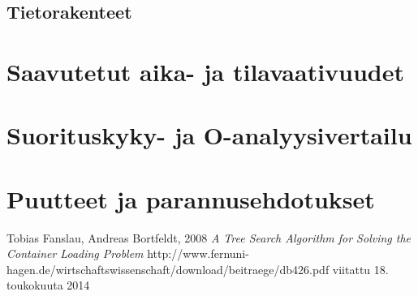 \documentclass[a4paper,12pt, titlepage]{article}
\begin{document}
\subsection*{Tietorakenteet}

\section*{Saavutetut aika- ja tilavaativuudet}

\section*{Suorituskyky- ja O-analyysivertailu}

\section*{Puutteet ja parannusehdotukset}

\begin{thebibliography}{9}

  Tobias Fanslau, Andreas Bortfeldt, 2008 \newline
  \emph{A Tree Search Algorithm for Solving the Container Loading Problem }\newline
  http://www.fernuni-hagen.de/wirtschaftswissenschaft/download/beitraege/db426.pdf\newline
  viitattu 18. toukokuuta 2014

\end{thebibliography}
\end{document}
